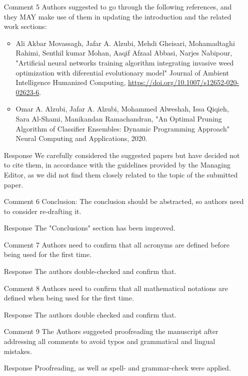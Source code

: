 \documentclass{article}
\begin{document}
\begin{itemize}
\item [Comment 5] Authors suggested to go through the following references, and they MAY make use of them in updating the introduction and the related work sections:
\begin{itemize}
\item Ali Akbar Movassagh, Jafar A. Alzubi, Mehdi Gheisari, Mohamadtaghi Rahimi, Senthil kumar Mohan, Aaqif Afzaal Abbasi, Narjes Nabipour, "Artificial neural networks training algorithm integrating invasive weed optimization with diferential evolutionary model" Journal of Ambient Intelligence Humanized Computing, \url{https://doi.org/10.1007/s12652-020-02623-6}.
\item Omar A. Alzubi, Jafar A. Alzubi, Mohammed Alweshah, Issa Qiqieh, Sara Al-Shami, Manikandan Ramachandran, "An Optimal Pruning Algorithm of Classifier Ensembles: Dynamic Programming Approach" Neural Computing and Applications, 2020.
\end{itemize}
\item [Response] We carefully considered the suggested papers but have decided not to cite them, in accordance with the guidelines provided by the Managing Editor, as we did not find them closely related to the topic of the submitted paper.
\item [Comment 6] Conclusion: The conclusion should be abstracted, so authors need to consider re-drafting it.
\item [Response] The "Conclusions" section has been improved.
\item [Comment 7] Authors need to confirm that all acronyms are defined before being used for the first time.
\item [Response] The authors double-checked and confirm that.
\item [Comment 8] Authors need to confirm that all mathematical notations are defined when being used for the first time.
\item [Response] The authors double checked and confirm that.
\item [Comment 9] The Authors suggested proofreading the manuscript after addressing all comments to avoid typos and grammatical and lingual mistakes.
\item [Response] Proofreading, as well as spell- and grammar-check were applied.
\end{itemize}



\end{document}
